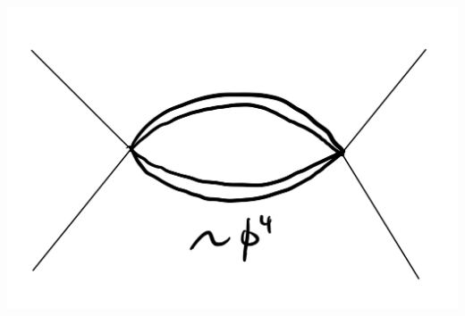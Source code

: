 \begin{center}
    \includegraphics[scale=0.35]{Lectures/Figures/lec14-interactionrenorm.png}
\end{center}



